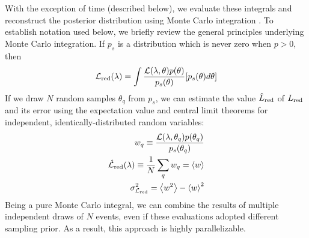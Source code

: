 With the exception of time (described below), we evaluate these integrals and reconstruct the posterior distribution using Monte Carlo integration
\cite{book-mm-NumericalRecipies,peter1978new}.   To establish notation used below, we briefly review the general principles  underlying Monte Carlo
integration.  If $p_s$ is a distribution which is never zero when $p>0$, then 
\begin{eqnarray}
{\cal L}_{\rm red}(\lambda) = \int \frac{{\cal L}(\lambda,\theta) p(\theta)}{p_s(\theta)} [p_s(\theta) d\theta]
\end{eqnarray}
% 
If we draw $N$ random samples $\theta_q$ from $p_s$, we can estimate the value $\hat{L}_{\rm red}$ of $L_{\rm red}$ and its error using the
expectation value and central limit theorems for independent, identically-distributed random variables:
\begin{eqnarray}
w_q \equiv \frac{{\cal L}(\lambda,\theta_q) p(\theta_q)}{p_s(\theta_q)} \\
\hat{{\cal L}}_{\rm red}(\lambda) \equiv \frac{1}{N} \sum_q w_q = \left<w\right> \\
\sigma_{{\cal L}_{\rm red}}^2 = \left<w^2\right> - \left<w\right>^2
\end{eqnarray}
Being a pure Monte Carlo integral, we can  combine the results of multiple independent draws of $N$ events, even if these
evaluations adopted different sampling prior.  As a result, this approach is highly parallelizable.  


